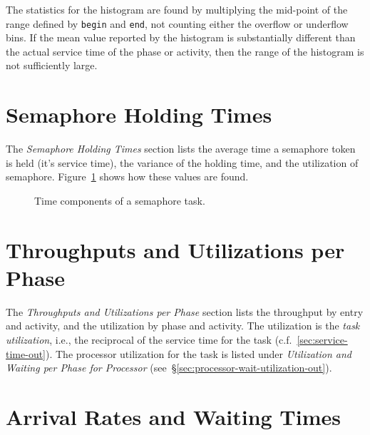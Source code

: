 The statistics for the histogram are found by multiplying the mid-point of the
range defined by \texttt{begin} and \texttt{end}, not counting either the overflow or underflow bins.  If
the mean value reported by the histogram is substantially different than the actual service time of the
phase or activity, then the range of the histogram is not sufficiently large.

\section{Semaphore Holding Times}
\label{sec:semaphore-holding}

The \emph{Semaphore Holding Times} section lists the average time a semaphore
token is held (it's service time), the variance of the holding time, and the utilization of
semaphore.  Figure~\ref{fig:semaphore-stats} shows
how these values are found.

\begin{figure}
  \centering
  \caption{Time components of a semaphore task.}
  \label{fig:semaphore-stats}
\end{figure}

\section{Throughputs and Utilizations per Phase}
\label{sec:througput-utilization-out}

The \emph{Throughputs and Utilizations per Phase} section lists the
throughput by entry and activity, and the utilization by phase and
activity. The utilization is the \emph{task utilization}, i.e., the
reciprocal of the service time for the task
(c.f.~\ref{sec:service-time-out}).  The processor
utilization for the task is listed under
\emph{Utilization and Waiting per Phase for Processor}
(see~\S\ref{sec:processor-wait-utilization-out}).

\section{Arrival Rates and Waiting Times}
\label{sec:open-wait-out}

